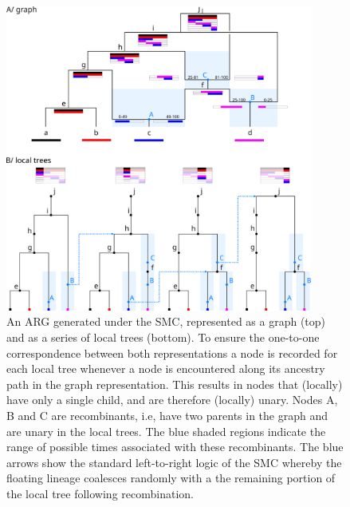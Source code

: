 \documentclass{article}
\begin{document}
\begin{figure}
\centering
\includegraphics[width=0.9\textwidth]{figures/smc_custom_2rows_area_full_hap.png}
\caption{An ARG generated under the SMC, represented as a graph (top) and as a
series of local trees (bottom). To ensure the one-to-one correspondence
between both representations a node is recorded for each local tree whenever
a node is encountered along its ancestry path in the graph representation.
This results in nodes that (locally) have only a single child, and are therefore
(locally) unary. 
Nodes A, B and C are recombinants, i.e, have two parents in the graph
and are unary in the local trees. The blue shaded regions indicate
the range of possible times associated with these recombinants.
The blue arrows show the
standard left-to-right logic of the SMC whereby
the floating lineage coalesces randomly
with a the remaining portion of the local tree following recombination.
}
\label{fig:smc-unary}
\end{figure}
\end{document}
